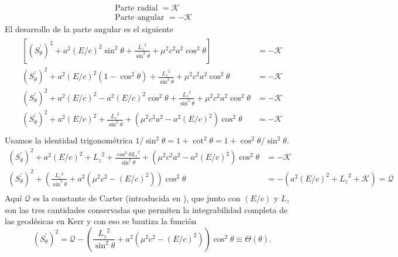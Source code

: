 $$
    \begin{array}{c}
        \text { Parte radial }=\mathcal{K} \\
        \text { Parte angular }=-\mathcal{K}
    \end{array}
$$
El desarrollo de la parte angular es el siguiente
\begin{align}
    \begin{aligned}
        \left[\left(S_\theta^{\prime}\right)^2+a^2 (E/c)^2 \sin ^2 \theta+\frac{{L_z}^2}{\sin ^2 \theta}+\mu^2 c^2 a^2 \cos ^2 \theta\right] & = -\mathcal{K} \\
        \left(S_\theta^{\prime}\right)^2+a^2 (E/c)^2 (1- \cos^2 \theta)+\frac{{L_z}^2}{\sin ^2 \theta}+\mu^2 c^2 a^2 \cos ^2 \theta          & = -\mathcal{K} \\
        \left(S_\theta^{\prime}\right)^2+a^2 (E/c)^2 - a^2 (E/c)^2 \cos^2 \theta+\frac{{L_z}^2}{\sin ^2 \theta}+\mu^2 c^2 a^2 \cos ^2 \theta & = -\mathcal{K} \\
        \left(S_\theta^{\prime}\right)^2+a^2 (E/c)^2+\frac{{L_z}^2}{\sin ^2 \theta}+(\mu^2 c^2 a^2 - a^2 (E/c)^2) \cos ^2 \theta             & = -\mathcal{K} \\
    \end{aligned}
\end{align}
Usamos la identidad trigonométrica $1 / \sin ^2 \theta=1+\cot ^2 \theta=1+\cos ^2 \theta / \sin ^2 \theta$.
\begin{equation}
    \begin{aligned}
        \left(S_\theta^{\prime}\right)^2+a^2 (E/c)^2+{L_z}^2+\frac{\cos^2 \theta {L_z}^2}{\sin ^2 \theta}+(\mu^2 c^2 a^2 - a^2 (E/c)^2) \cos ^2 \theta & = -\mathcal{K}                                    \\
        \left(S_\theta^{\prime}\right)^2+\left(\frac{ {L_z}^2}{\sin ^2 \theta}+a^2(\mu^2 c^2  -  (E/c)^2) \right)\cos ^2 \theta                        & = -(a^2 (E/c)^2+{L_z}^2+\mathcal{K}) =\mathcal{Q} \\
    \end{aligned}
\end{equation}
Aquí $\mathcal{Q}$ es la constante de Carter (introducida en \cite{carter-1968}), que junto con $(E/c)$ y ${L_z}$ son las tres cantidades conservadas que permiten la integrabilidad completa de las geodésicas en Kerr y con eso se bautiza la función
\begin{equation}
    \left(S_\theta^{\prime}\right)^2=\mathcal{Q}-\left(\frac{{L_z}^2}{\sin ^2 \theta}+a^2\left(\mu^2 c^2-(E/c)^2\right)\right) \cos ^2 \theta \equiv \Theta(\theta) .
\end{equation}

